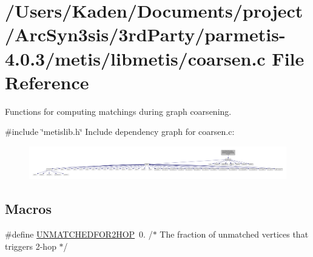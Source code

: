 \hypertarget{a00182}{}\section{/\+Users/\+Kaden/\+Documents/project/\+Arc\+Syn3sis/3rd\+Party/parmetis-\/4.0.3/metis/libmetis/coarsen.c File Reference}
\label{a00182}


Functions for computing matchings during graph coarsening.  


{\ttfamily \#include \char`\"{}metislib.\+h\char`\"{}}\newline
Include dependency graph for coarsen.\+c\+:\nopagebreak
\begin{figure}[H]
\begin{center}
\leavevmode
\includegraphics[width=350pt]{a00183}
\end{center}
\end{figure}
\subsection*{Macros}
\begin{DoxyCompactItemize}
\item 
\#define \hyperlink{a00182_ad49dc6effe759748c2065146d166c742}{U\+N\+M\+A\+T\+C\+H\+E\+D\+F\+O\+R2\+H\+OP}~0.  /$\ast$ The fraction of unmatched vertices that triggers 2-\/hop $\ast$/
\end{DoxyCompactItemize}
